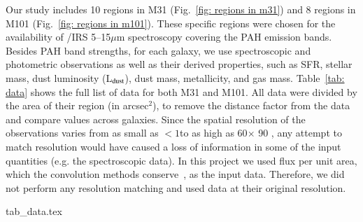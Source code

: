 Our study includes 10 regions in M31 (Fig.~\ref{fig: regions in m31}) and 8 regions in M101 (Fig.~\ref{fig: regions in m101}). 
These specific regions were chosen for the availability of \Spitzer/IRS 5--15$\mu$m  spectroscopy covering the PAH emission bands.
Besides PAH band strengths, for each galaxy, we use spectroscopic and photometric observations as well as their derived properties, such as SFR, stellar mass, dust luminosity (L$_{\rm dust}$), dust mass, metallicity, and gas mass.
Table~\ref{tab: data} shows the full list of data for both M31 and M101.
All data were divided by the area of their region (in arcsec$^2$), to remove the distance factor from the data and compare values across galaxies.
Since the spatial resolution of the observations varies from as small as $<1$\arcsec to as high as 60\arcsec $\times$ 90 \arcsec, any attempt to match resolution would have caused a loss of information in some of the input quantities (e.g. the spectroscopic data).
In this project we used flux per unit area, which the convolution methods conserve~\citep{Aniano12}, as the input data.
Therefore, we did not perform any resolution matching and used data at their original resolution.

    {tab_data.tex}

